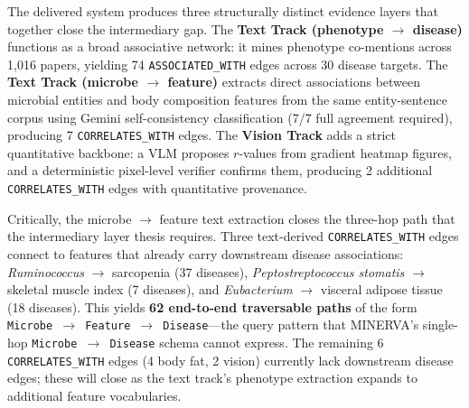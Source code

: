 \documentclass[12pt, letterpaper]{article}
\begin{document}
The delivered system produces three structurally distinct evidence layers that together close the intermediary gap. The \textbf{Text Track (phenotype $\to$ disease)} functions as a broad associative network: it mines phenotype co-mentions across 1,016 papers, yielding 74 \texttt{ASSOCIATED\_WITH} edges across 30 disease targets. The \textbf{Text Track (microbe $\to$ feature)} extracts direct associations between microbial entities and body composition features from the same entity-sentence corpus using Gemini self-consistency classification (7/7 full agreement required), producing 7 \texttt{CORRELATES\_WITH} edges. The \textbf{Vision Track} adds a strict quantitative backbone: a VLM proposes $r$-values from gradient heatmap figures, and a deterministic pixel-level verifier confirms them, producing 2 additional \texttt{CORRELATES\_WITH} edges with quantitative provenance.

Critically, the microbe $\to$ feature text extraction closes the three-hop path that the intermediary layer thesis requires. Three text-derived \texttt{CORRELATES\_WITH} edges connect to features that already carry downstream disease associations: \textit{Ruminococcus} $\to$ sarcopenia (37 diseases), \textit{Peptostreptococcus stomatis} $\to$ skeletal muscle index (7 diseases), and \textit{Eubacterium} $\to$ visceral adipose tissue (18 diseases). This yields \textbf{62 end-to-end traversable paths} of the form \texttt{Microbe $\to$ Feature $\to$ Disease}---the query pattern that MINERVA's single-hop \texttt{Microbe $\to$ Disease} schema cannot express. The remaining 6 \texttt{CORRELATES\_WITH} edges (4 body fat, 2 vision) currently lack downstream disease edges; these will close as the text track's phenotype extraction expands to additional feature vocabularies.
\end{document}
